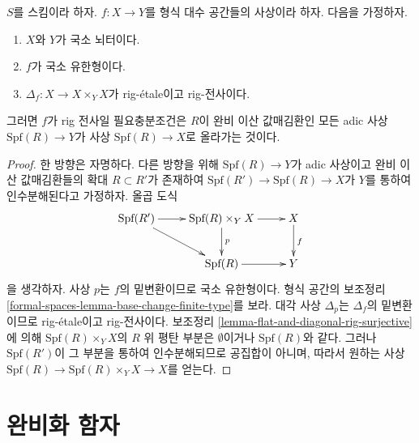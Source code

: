 \begin{lemma}
\label{lemma-rig-monomorphism-rig-surjective}
$S$를 스킴이라 하자. $f : X \to Y$를 형식 대수 공간들의 사상이라 하자.
다음을 가정하자.
\begin{enumerate}
\item $X$와 $Y$가 국소 뇌터이다.
\item $f$가 국소 유한형이다.
\item $\Delta_f : X \to X \times_Y X$가 rig-\'etale이고 rig-전사이다.
\end{enumerate}
그러면 $f$가 rig 전사일 필요충분조건은 $R$이 완비 이산 값매김환인 모든
adic 사상 $\text{Spf}(R) \to Y$가 사상 $\text{Spf}(R) \to X$로
올라가는 것이다.
\end{lemma}

\begin{proof}
한 방향은 자명하다. 다른 방향을 위해 $\text{Spf}(R) \to Y$가 adic
사상이고 완비 이산 값매김환들의 확대 $R \subset R'$가 존재하여
$\text{Spf}(R') \to \text{Spf}(R) \to X$가 $Y$를 통하여 인수분해된다고
가정하자. 올곱 도식
$$
\xymatrix{
\text{Spf}(R') \ar[r] \ar[rd] &
\text{Spf}(R) \times_Y X \ar[r] \ar[d]^p &
X \ar[d]^f \\
&
\text{Spf}(R) \ar[r] &
Y
}
$$
을 생각하자. 사상 $p$는 $f$의 밑변환이므로 국소 유한형이다. 형식 공간의
보조정리 \ref{formal-spaces-lemma-base-change-finite-type}를 보라.
대각 사상 $\Delta_p$는 $\Delta_f$의 밑변환이므로 rig-\'etale이고
rig-전사이다. 보조정리 \ref{lemma-flat-and-diagonal-rig-surjective}에 의해
$\text{Spf}(R) \times_Y X$의 $R$ 위 평탄 부분은 $\emptyset$이거나
$\text{Spf}(R)$와 같다. 그러나 $\text{Spf}(R')$이 그 부분을 통하여
인수분해되므로 공집합이 아니며, 따라서 원하는 사상
$\text{Spf}(R) \to \text{Spf}(R) \times_Y X \to X$를 얻는다.
\end{proof}
 
\section{완비화 함자}
\label{section-completion-functor}

